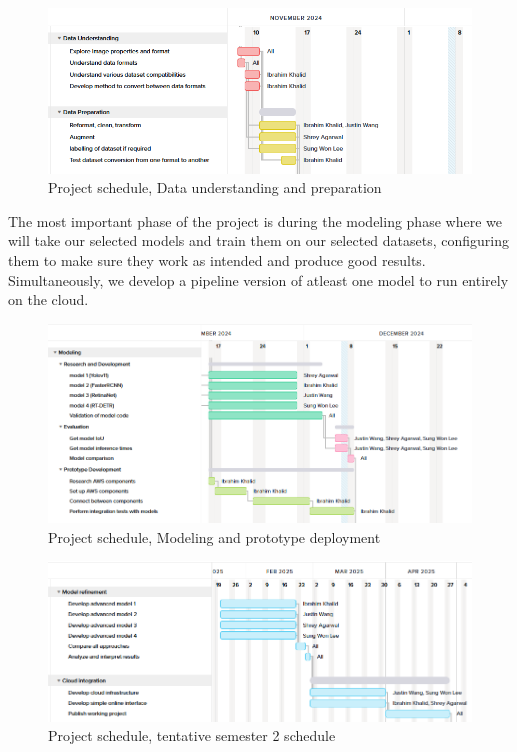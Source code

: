 \documentclass[stu,12pt,floatsintext]{apa7}
\begin{document}
\begin{figure}[!htb]
    \centering
    \includegraphics[width=\linewidth]{images/gantt/gantt_2.png}
    \caption{Project schedule, Data understanding and preparation}
    \label{fig:gantt_2}
\end{figure}

The most important phase of the project is during the modeling phase where we will take our selected models and train them on our selected datasets, configuring them to make sure they work as intended and produce good results. Simultaneously, we develop a pipeline version of atleast one model to run entirely on the cloud.

\begin{figure}[!htb]
    \centering
    \includegraphics[width=\linewidth]{images/gantt/gantt_3.png}
    \caption{Project schedule, Modeling and prototype deployment}
    \label{fig:gantt_3}
\end{figure}


\begin{figure}[!htb]
    \centering
    \includegraphics[width=\linewidth]{images/gantt/gantt_4.png}
    \caption{Project schedule, tentative semester 2 schedule}
    \label{fig:gantt_4}
\end{figure}
\end{document}
